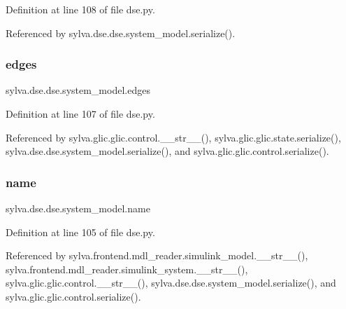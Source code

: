 Definition at line 108 of file dse.\+py.



Referenced by sylva.\+dse.\+dse.\+system\+\_\+model.\+serialize().

\mbox{\label{classsylva_1_1dse_1_1dse_1_1system__model_a73a36bb2c1ddb4fa3558e4a5887decaa}} 
\subsubsection{\texorpdfstring{edges}{edges}}
{\footnotesize\ttfamily sylva.\+dse.\+dse.\+system\+\_\+model.\+edges}



Definition at line 107 of file dse.\+py.



Referenced by sylva.\+glic.\+glic.\+control.\+\_\+\+\_\+str\+\_\+\+\_\+(), sylva.\+glic.\+glic.\+state.\+serialize(), sylva.\+dse.\+dse.\+system\+\_\+model.\+serialize(), and sylva.\+glic.\+glic.\+control.\+serialize().

\mbox{\label{classsylva_1_1dse_1_1dse_1_1system__model_a8b435a2014aa563c8cb50ce7d91dfdc8}} 
\subsubsection{\texorpdfstring{name}{name}}
{\footnotesize\ttfamily sylva.\+dse.\+dse.\+system\+\_\+model.\+name}



Definition at line 105 of file dse.\+py.



Referenced by sylva.\+frontend.\+mdl\+\_\+reader.\+simulink\+\_\+model.\+\_\+\+\_\+str\+\_\+\+\_\+(), sylva.\+frontend.\+mdl\+\_\+reader.\+simulink\+\_\+system.\+\_\+\+\_\+str\+\_\+\+\_\+(), sylva.\+glic.\+glic.\+control.\+\_\+\+\_\+str\+\_\+\+\_\+(), sylva.\+dse.\+dse.\+system\+\_\+model.\+serialize(), and sylva.\+glic.\+glic.\+control.\+serialize().

